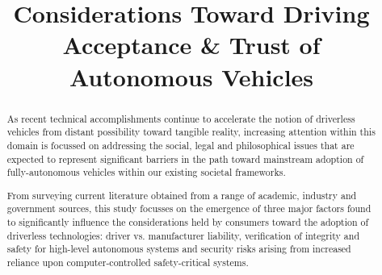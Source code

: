 \documentclass[conference]{IEEEtran}
\begin{document}
%


%

\title{Considerations Toward Driving Acceptance \& Trust of Autonomous Vehicles}

\author{
}



\maketitle

\begin{abstract}
  As recent technical accomplishments continue to accelerate the notion of driverless vehicles from distant possibility toward tangible reality, increasing attention within this domain is focussed on addressing the social, legal and philosophical issues that are expected to represent significant barriers in the path toward mainstream adoption of fully-autonomous vehicles within our existing societal frameworks.
  
From surveying current literature obtained from a range of academic, industry and government sources, this study focusses on the emergence of three major factors found to significantly influence the considerations held by consumers toward the adoption of driverless technologies: driver vs. manufacturer liability, verification of integrity and safety for high-level autonomous systems and security risks arising from increased reliance upon computer-controlled safety-critical systems.
\end{abstract}
\end{document}
